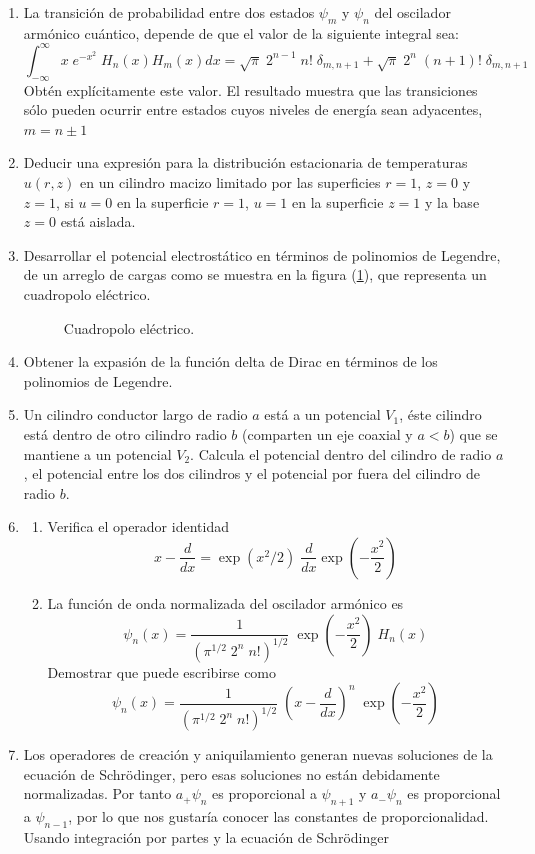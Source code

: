 \begin{enumerate}
\item La transición de probabilidad entre dos estados $\psi_{m}$ y $\psi_{n}$ del oscilador armónico cuántico, depende de que el valor de la siguiente integral sea:
\[ \int_{-\infty}^{\infty} x \; e^{-x^{2}} \; H_{n} (x) H_{m}(x) dx = \sqrt{\pi} \; 2^{n-1} \; n! \; \delta_{m, n + 1} + \sqrt{\pi} \; 2^{n} \; (n + 1)! \; \delta_{m, n + 1} \]
Obtén explícitamente este valor. El resultado muestra que las transiciones sólo pueden ocurrir entre estados cuyos niveles de energía sean adyacentes, $m = n \pm 1$
\item Deducir una expresión para la distribución estacionaria de temperaturas $u(r,z)$ en un cilindro macizo limitado por las superficies $r = 1$, $z = 0$ y $z = 1$, si $u = 0$ en la superficie $r = 1$, $u = 1$ en la superficie $z = 1$ y la base $z = 0$ está aislada.
\item Desarrollar el potencial electrostático en términos de polinomios de Legendre, de un arreglo de cargas como se muestra en la figura (\ref{fig:figura1}), que representa un cuadropolo eléctrico.
\begin{figure}[H]
\centering

\caption{Cuadropolo eléctrico.}
\label{fig:figura1}
\end{figure}
\item Obtener la expasión de la función delta de Dirac en términos de los polinomios de Legendre.
\item Un cilindro conductor largo de radio $a$ está a un potencial $V_{1}$, éste cilindro está dentro de otro cilindro radio $b$ (comparten un eje coaxial y $a < b$) que se mantiene a un potencial $V_{2}$. Calcula el potencial dentro del cilindro de radio $a$, el potencial entre los dos cilindros y el potencial por fuera del cilindro de radio $b$.
\item \begin{enumerate}[label=\alph{*})]
\item Verifica el operador identidad
\[ x - \dfrac{d}{dx} = \exp(x^{2}/2) \; \dfrac{d}{dx} \exp \left(- \dfrac{x^{2}}{2} \right) \]
\item La función de onda normalizada del oscilador armónico es
\[ \psi_{n} (x) = \dfrac{1}{(\pi^{1/2} \; 2^{n} \; n!)^{1/2}} \; \exp \left(- \dfrac{x^{2}}{2} \right) \; H_{n}(x) \]
Demostrar que puede escribirse como
\[ \psi_{n} (x) = \dfrac{1}{(\pi^{1/2} \; 2^{n} \; n!)^{1/2}} \; \left( x - \dfrac{d}{dx} \right)^{n} \; \exp \left(- \dfrac{x^{2}}{2} \right) \]
\end{enumerate}
\item Los operadores de creación y aniquilamiento generan nuevas soluciones de la ecuación de Schrödinger, pero esas soluciones no están debidamente normalizadas. Por tanto $a_{+} \psi_{n}$ es proporcional a $\psi_{n+1}$ y $a_{-} \psi_{n}$ es proporcional a $\psi_{n-1}$, por lo que nos gustaría conocer las constantes de proporcionalidad. Usando integración por partes y la ecuación de Schrödinger

\end{enumerate}
